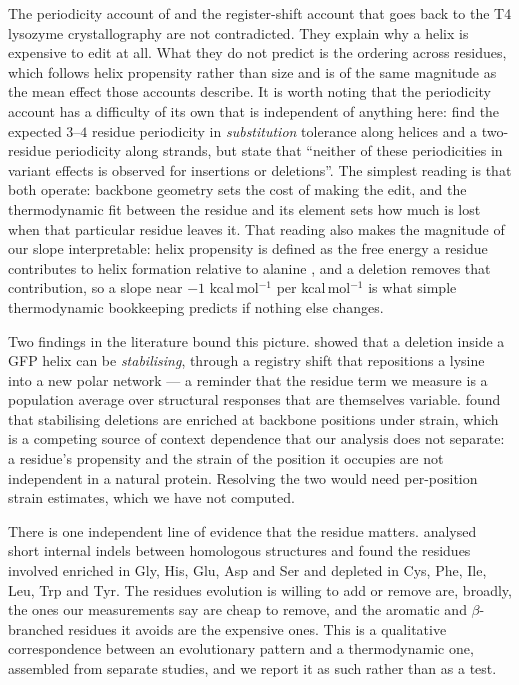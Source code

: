 \documentclass[11pt]{article}
\begin{document}
The periodicity account of \citet{goldman2025} and the register-shift account that goes back to
the T4 lysozyme crystallography \citep{heinz1993,heinz1994,vetter1996} are not contradicted. They
explain why a helix is expensive to edit at all. What they do not predict is the ordering across
residues, which follows helix propensity rather than size and is of the same magnitude as the
mean effect those accounts describe. It is worth noting that the periodicity account has a
difficulty of its own that is independent of anything here: \citet{topolska2025} find the expected
$3$--$4$ residue periodicity in \emph{substitution} tolerance along helices and a two-residue
periodicity along strands, but state that ``neither of these periodicities in variant effects is
observed for insertions or deletions''. The simplest reading is that both operate: backbone geometry
sets the cost of making the edit, and the thermodynamic fit between the residue and its element
sets how much is lost when that particular residue leaves it. That reading also makes the
magnitude of our slope interpretable: helix propensity is defined as the free energy a residue
contributes to helix formation relative to alanine \citep{pace1998}, and a deletion removes that
contribution, so a slope near $-1$ kcal\,mol$^{-1}$ per kcal\,mol$^{-1}$ is what simple
thermodynamic bookkeeping predicts if nothing else changes.

Two findings in the literature bound this picture. \citet{arpino2014} showed that a deletion
inside a GFP helix can be \emph{stabilising}, through a registry shift that repositions a lysine
into a new polar network --- a reminder that the residue term we measure is a population average
over structural responses that are themselves variable. \citet{gutierrez2024} found that
stabilising deletions are enriched at backbone positions under strain, which is a competing source
of context dependence that our analysis does not separate: a residue's propensity and the strain
of the position it occupies are not independent in a natural protein. Resolving the two would need
per-position strain estimates, which we have not computed.

There is one independent line of evidence that the residue matters. \citet{kim2010} analysed short
internal indels between homologous structures and found the residues involved enriched in Gly,
His, Glu, Asp and Ser and depleted in Cys, Phe, Ile, Leu, Trp and Tyr. The residues evolution is
willing to add or remove are, broadly, the ones our measurements say are cheap to remove, and the
aromatic and $\beta$-branched residues it avoids are the expensive ones. This is a qualitative
correspondence between an evolutionary pattern and a thermodynamic one, assembled from separate
studies, and we report it as such rather than as a test.
\end{document}
